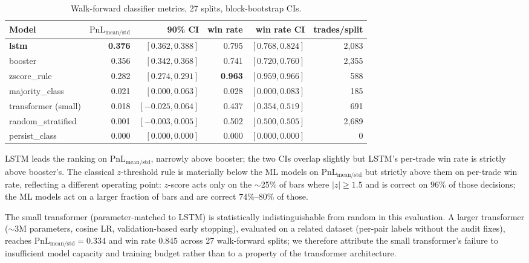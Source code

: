 \documentclass[11pt]{article}
\begin{document}
\begin{table}[h]
\centering
\caption{Walk-forward classifier metrics, 27 splits, block-bootstrap CIs.}
\label{tab:wf-deep}
\small
\begin{tabular}{lrrrrr}
\toprule
Model & $\text{PnL}_{\text{mean/std}}$ & 90\% CI & win rate & win rate CI & trades/split \\
\midrule
\textbf{lstm}                & \textbf{0.376} & $[0.362, 0.388]$ & 0.795 & $[0.768, 0.824]$ & 2{,}083 \\
booster                       & 0.356 & $[0.342, 0.368]$ & 0.741 & $[0.720, 0.760]$ & 2{,}355 \\
zscore\_rule                  & 0.282 & $[0.274, 0.291]$ & \textbf{0.963} & $[0.959, 0.966]$ & 588 \\
majority\_class               & 0.021 & $[0.000, 0.063]$ & 0.028 & $[0.000, 0.083]$ & 185 \\
transformer (small)           & 0.018 & $[-0.025, 0.064]$ & 0.437 & $[0.354, 0.519]$ & 691 \\
random\_stratified            & 0.001 & $[-0.003, 0.005]$ & 0.502 & $[0.500, 0.505]$ & 2{,}689 \\
persist\_class                & 0.000 & $[0.000, 0.000]$ & 0.000 & $[0.000, 0.000]$ & 0 \\
\bottomrule
\end{tabular}
\end{table}

LSTM leads the ranking on $\text{PnL}_{\text{mean/std}}$, narrowly
above booster; the two CIs overlap slightly but LSTM's per-trade win
rate is strictly above booster's. The classical $z$-threshold rule is
materially below the ML models on $\text{PnL}_{\text{mean/std}}$ but
strictly above them on per-trade win rate, reflecting a different
operating point: $z$-score acts only on the $\sim$25\% of bars where
$|z| \geq 1.5$ and is correct on $96\%$ of those decisions; the ML
models act on a larger fraction of bars and are correct $74\%$--$80\%$
of those.

The small transformer (parameter-matched to LSTM) is statistically
indistinguishable from random in this evaluation. A larger
transformer ($\sim$3M parameters, cosine LR, validation-based early
stopping), evaluated on a related dataset (per-pair labels without
the audit fixes), reaches $\text{PnL}_{\text{mean/std}} = 0.334$ and
win rate $0.845$ across 27 walk-forward splits; we therefore attribute
the small transformer's failure to insufficient model capacity and
training budget rather than to a property of the transformer
architecture.
\end{document}
